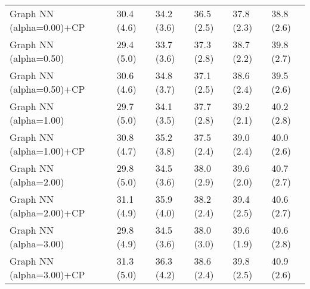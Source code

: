 \documentclass{article}
\begin{document}
\begin{table*}[t!]
\begin{center}
\begin{small}
\begin{sc}
\begin{tabular}{llllll}
Graph NN (alpha=0.00)+CP&30.4 (4.6)      &34.2 (3.6)      &36.5 (2.5)      &37.8 (2.3)      &38.8 (2.6)      \\
Graph NN (alpha=0.50)&29.4 (5.0)      &33.7 (3.6)      &37.3 (2.8)      &38.7 (2.2)      &39.8 (2.7)      \\
Graph NN (alpha=0.50)+CP&30.6 (4.6)      &34.8 (3.7)      &37.1 (2.5)      &38.6 (2.4)      &39.5 (2.6)      \\
Graph NN (alpha=1.00)&29.7 (5.0)      &34.1 (3.5)      &37.7 (2.8)      &39.2 (2.1)      &40.2 (2.8)      \\
Graph NN (alpha=1.00)+CP&30.8 (4.7)      &35.2 (3.8)      &37.5 (2.4)      &39.0 (2.4)      &40.0 (2.6)      \\
Graph NN (alpha=2.00)&29.8 (5.0)      &34.5 (3.6)      &38.0 (2.9)      &39.6 (2.0)      &40.7 (2.7)      \\
Graph NN (alpha=2.00)+CP&31.1 (4.9)      &35.9 (4.0)      &38.2 (2.4)      &39.4 (2.5)      &40.6 (2.7)      \\
Graph NN (alpha=3.00)&29.8 (4.9)      &34.5 (3.6)      &38.0 (3.0)      &39.6 (1.9)      &40.6 (2.8)      \\
Graph NN (alpha=3.00)+CP&31.3 (5.0)      &36.3 (4.2)      &38.6 (2.4)      &39.8 (2.5)      &40.9 (2.6)      \\
\bottomrule
\end{tabular}
\end{sc}
\end{small}
\end{center}
\vskip -0.1in
\end{table*}
\end{document}
